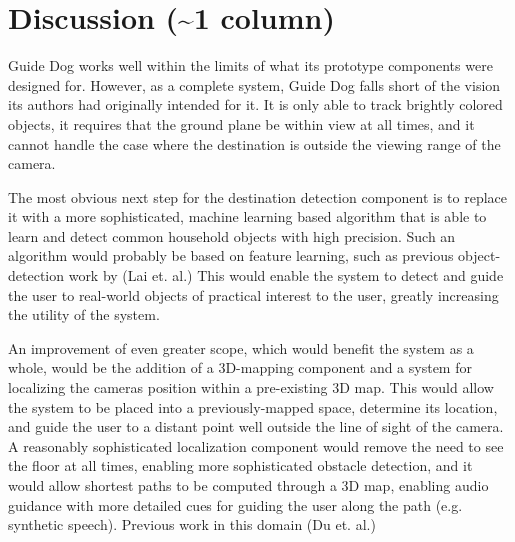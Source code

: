 \section{Discussion (\textasciitilde 1 column)}
\label{sec:discussion}

Guide Dog works well within the limits of what its prototype components were
designed for. However, as a complete system, Guide Dog falls short of the 
vision its authors had originally intended for it. It is only able to track
brightly colored objects, it requires that the ground plane be within view
at all times, and it cannot handle the case where the destination is outside
the viewing range of the camera. 

The most obvious next step for the destination detection component is to
replace it with a more sophisticated, machine learning based algorithm that
is able to learn and detect common household objects with high precision.
Such an algorithm would probably be based on feature learning, such as
previous object-detection work by (Lai et. al.)
This would enable the system to detect and guide the user to real-world
objects of practical interest to the user, greatly increasing the
utility of the system.

An improvement of even greater scope, which would benefit the system as
a whole, would be the addition of a 3D-mapping component and a system
for localizing the cameras position within a pre-existing 3D map. This
would allow the system to be placed into a previously-mapped space,
determine its location, and guide the user to a distant point well
outside the line of sight of the camera. A reasonably sophisticated 
localization component would remove the need to see the floor at all
times, enabling more sophisticated obstacle detection, and it would 
allow shortest paths to be computed through a 3D map, enabling audio
guidance with more detailed cues for guiding the user along the path
(e.g. synthetic speech). Previous work in this domain (Du et. al.)



